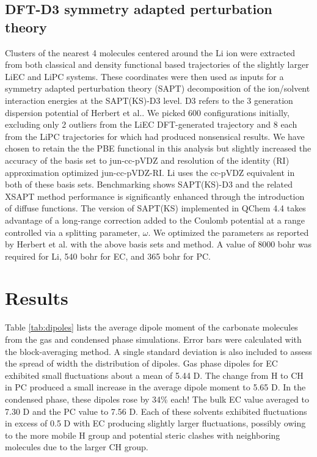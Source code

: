 \begin{ecpc}
   \subsection{\label{ch4:sec1:level4}DFT-D3 symmetry adapted perturbation theory}
    Clusters of the nearest 4 molecules centered around the Li\sur{+} ion were extracted from both classical and density functional based trajectories
    of the slightly larger Li\sur{+}EC and Li\sur{+}PC systems. These coordinates were then used as inputs for a symmetry adapted 
    perturbation theory (SAPT) decomposition of the ion/solvent interaction energies at the SAPT(KS)-D3 level. D3 refers to the 3 generation
    dispersion potential of Herbert et al.\cite{lao2014xsaptksd3}. We picked 600 configurations initially, excluding only 2 outliers from the Li\sur{+}EC DFT-generated 
    trajectory and 8 each from the Li\sur{+}PC trajectories for which had produced nonsensical results. We have chosen to retain the the PBE 
    functional in this analysis but slightly increased the accuracy of the basis set to jun-cc-pVDZ and resolution of the identity (RI) approximation 
    optimized jun-cc-pVDZ-RI. Li\sur{+} uses the cc-pVDZ equivalent in both of these basis sets. Benchmarking shows SAPT(KS)-D3 and the related XSAPT 
    method performance is significantly enhanced through the introduction of diffuse functions. The version of SAPT(KS) implemented in QChem 4.4\cite{krylov2013qchem,shao2006qchem} takes 
    advantage of a long-range correction added to the Coulomb potential at a range controlled via a splitting parameter, $\omega$. We optimized the 
    parameters as reported by Herbert et al. with the above basis sets and method\cite{lao2014xsaptksd3}. A value of 8000 bohr was required for Li\sur{+}, 540 
    bohr for EC, and 365 bohr for PC.
  
  \section{\label{ch4:sec2:level1}Results}
   Table \ref{tab:dipoles} lists the average dipole moment of the carbonate molecules from the gas and condensed phase simulations. Error bars were
   calculated with the block-averaging method. A single standard deviation is also included to assess the spread of width the distribution of dipoles.
   Gas phase dipoles for EC exhibited small fluctuations about a mean of 5.44 D. The change from H to CH in PC produced a small increase in 
   the average dipole moment to 5.65 D. In the condensed phase, these dipoles rose by 34\% each! The bulk EC value averaged to 7.30 D and the PC value
   to 7.56 D. Each of these solvents exhibited fluctuations in excess of 0.5 D with EC producing slightly larger fluctuations, possibly owing to the
   more mobile H group and potential steric clashes with neighboring molecules due to the larger CH group. 
   

\end{ecpc}
